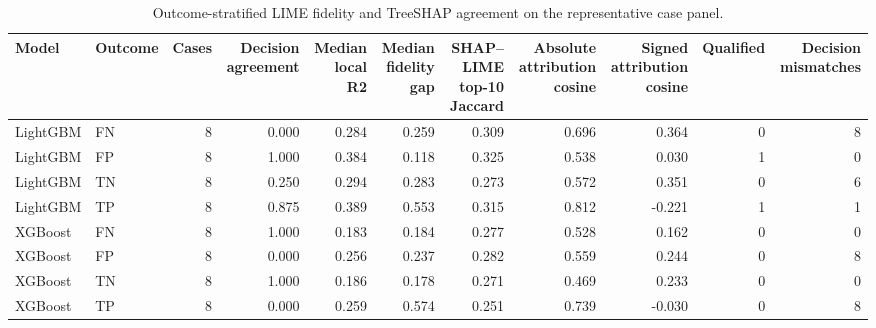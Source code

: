 \begin{table}
\caption{Outcome-stratified LIME fidelity and TreeSHAP agreement on the representative case panel.}
\label{tab:lime_outcome_stratified}
\begin{tabular}{llrrrrrrrrr}
\toprule
Model & Outcome & Cases & Decision agreement & Median local R2 & Median fidelity gap & SHAP–LIME top-10 Jaccard & Absolute attribution cosine & Signed attribution cosine & Qualified & Decision mismatches \\
\midrule
LightGBM & FN & 8 & 0.000 & 0.284 & 0.259 & 0.309 & 0.696 & 0.364 & 0 & 8 \\
LightGBM & FP & 8 & 1.000 & 0.384 & 0.118 & 0.325 & 0.538 & 0.030 & 1 & 0 \\
LightGBM & TN & 8 & 0.250 & 0.294 & 0.283 & 0.273 & 0.572 & 0.351 & 0 & 6 \\
LightGBM & TP & 8 & 0.875 & 0.389 & 0.553 & 0.315 & 0.812 & -0.221 & 1 & 1 \\
XGBoost & FN & 8 & 1.000 & 0.183 & 0.184 & 0.277 & 0.528 & 0.162 & 0 & 0 \\
XGBoost & FP & 8 & 0.000 & 0.256 & 0.237 & 0.282 & 0.559 & 0.244 & 0 & 8 \\
XGBoost & TN & 8 & 1.000 & 0.186 & 0.178 & 0.271 & 0.469 & 0.233 & 0 & 0 \\
XGBoost & TP & 8 & 0.000 & 0.259 & 0.574 & 0.251 & 0.739 & -0.030 & 0 & 8 \\
\bottomrule
\end{tabular}
\end{table}
